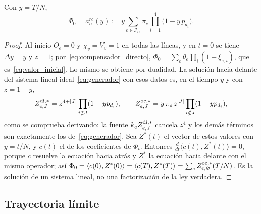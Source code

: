 \begin{lema}\label{lem:valor_inicial}
Con $y=T/N$,
\begin{equation}\label{eq:valor_inicial}
 \Phi_0=a_n^{rc}(y):=y\sum_{e\in\mathcal I_{rc}}\pi_e\prod_{i=1}^4\bigl(1-y\,p_{d_i}\bigr).
\end{equation}
\end{lema}

\begin{proof}
Al inicio $O_e=0$ y $\chi_v=V_v=1$ en todas las líneas, y en $t=0$ se tiene $\Delta y=y$ y $z=1$;
por~\eqref{eq:compensador_directo}, $\Phi_0=\sum_e\theta_e\prod_i(1-\xi_{e,i})$, que
es~\eqref{eq:valor_inicial}. Lo mismo se obtiene por dualidad. La solución hacia delante del
sistema lineal ideal~\eqref{eq:generador} con esos datos es, en el tiempo $y$ y con $z=1-y$,
\[
 Z^{\mathrm{di},*}_{e,J}=z^{4+|J|}\prod_{i\notin J}(1-yp_{d_i}),\qquad
 Z^{\mathrm{oc},*}_{e,J}=y\,\pi_e\,z^{|J|}\prod_{i\notin J}(1-yp_{d_i}),
\]
como se comprueba derivando: la fuente $k_eZ^{\mathrm{di},*}_{e,J}$ cancela $z^4$ y los demás términos
son exactamente los de~\eqref{eq:generador}. Sea $Z^*(t)$ el vector de estos valores con $y=t/N$,
y $c(t)$ el de los coeficientes de $\Phi_t$. Entonces $\frac{d}{dt}\langle c(t),Z^*(t)\rangle=0$,
porque $c$ resuelve la ecuación hacia atrás y $Z^*$ la ecuación hacia delante con el mismo
operador; así $\Phi_0=\langle c(0),Z^*(0)\rangle=\langle c(T),Z^*(T)\rangle
=\sum_eZ^{\mathrm{oc},*}_{e,\varnothing}(T/N)$. Es la solución de un sistema lineal, no una
factorización de la ley verdadera.
\end{proof}

\subsection{Trayectoria límite}\label{subsec:trayectoria}


